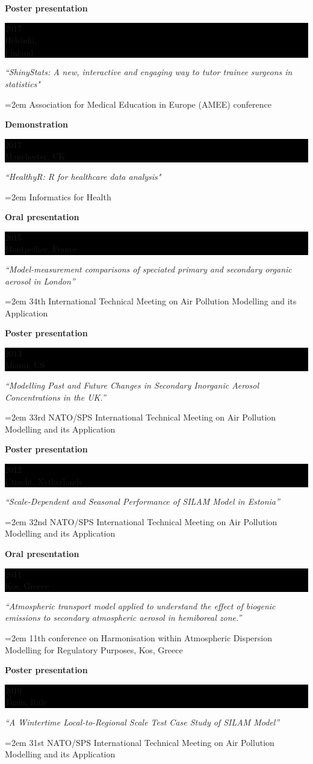\documentclass[paper=a4,fontsize=11pt]{scrartcl} %
\newcommand{\sepspace}{\vspace*{1em}}       %
\newcommand{\EducationEntry}[4]{
        \noindent \textbf{#1} \hfill      %
        \colorbox{Black}{%
            \parbox{6em}{%
            \hfill\color{White}#2}} \par  %
        \noindent \textit{#3} \par        %
        \noindent\hangindent=2em\hangafter=0 \small #4 %
        \normalsize \par}
\begin{document}
\EducationEntry{Poster presentation}{2017 \\ Helsinki,\\ Finland}{``ShinyStats: A new, interactive and engaging way to tutor trainee surgeons in statistics"}{Association for Medical Education in Europe (AMEE) conference}

\EducationEntry{Demonstration}{2017 \\ Manchester, UK}{``HealthyR: R for healthcare data analysis"}{Informatics for Health}

\EducationEntry{Oral presentation}{2015 \\ Montpellier, France}{``Model-measurement comparisons of speciated primary and secondary organic aerosol in London''}{34th International Technical Meeting on Air Pollution Modelling and its Application}

\EducationEntry{Poster presentation}{2013 \\ Miami, US}{``Modelling Past and Future Changes in Secondary Inorganic Aerosol Concentrations in the UK.''}{33rd NATO/SPS International Technical Meeting on Air Pollution Modelling and its Application}


\EducationEntry{Poster presentation}{2012 \\ Utrecht, Netherlands}{``Scale-Dependent and Seasonal Performance of SILAM Model in Estonia''}{32nd NATO/SPS International Technical Meeting on Air Pollution Modelling and its Application}

\EducationEntry{Oral presentation}{2011 \\ Kos, Greece}{``Atmospheric transport model applied to understand the effect of biogenic emissions to secondary atmospheric aerosol in hemiboreal zone.''}{11th conference on Harmonisation within Atmospheric Dispersion Modelling for Regulatory Purposes, Kos, Greece}

\EducationEntry{Poster presentation}{2010 \\ Turin, Italy}{``A Wintertime Local-to-Regional Scale Test Case Study of SILAM Model''}{31st NATO/SPS International Technical Meeting on Air Pollution Modelling and its Application}
\end{document}
